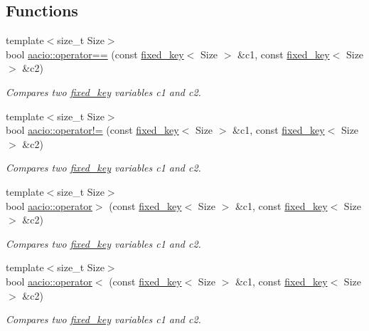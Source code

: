 \subsection*{Functions}
\begin{DoxyCompactItemize}
\item 
{\footnotesize template$<$size\+\_\+t Size$>$ }\\bool \mbox{\hyperlink{group__fixed__key_gaa365a67b127212444054c9efbaad8b4b}{aacio\+::operator==}} (const \mbox{\hyperlink{classaacio_1_1fixed__key}{fixed\+\_\+key}}$<$ Size $>$ \&c1, const \mbox{\hyperlink{classaacio_1_1fixed__key}{fixed\+\_\+key}}$<$ Size $>$ \&c2)
\begin{DoxyCompactList}\small\item\em Compares two \mbox{\hyperlink{classaacio_1_1fixed__key}{fixed\+\_\+key}} variables c1 and c2. \end{DoxyCompactList}\item 
{\footnotesize template$<$size\+\_\+t Size$>$ }\\bool \mbox{\hyperlink{group__fixed__key_ga89d7a8005af97542faaa281cec576db7}{aacio\+::operator!=}} (const \mbox{\hyperlink{classaacio_1_1fixed__key}{fixed\+\_\+key}}$<$ Size $>$ \&c1, const \mbox{\hyperlink{classaacio_1_1fixed__key}{fixed\+\_\+key}}$<$ Size $>$ \&c2)
\begin{DoxyCompactList}\small\item\em Compares two \mbox{\hyperlink{classaacio_1_1fixed__key}{fixed\+\_\+key}} variables c1 and c2. \end{DoxyCompactList}\item 
{\footnotesize template$<$size\+\_\+t Size$>$ }\\bool \mbox{\hyperlink{group__fixed__key_ga56d88aaf07a50b73e0494386c9f74fe9}{aacio\+::operator$>$}} (const \mbox{\hyperlink{classaacio_1_1fixed__key}{fixed\+\_\+key}}$<$ Size $>$ \&c1, const \mbox{\hyperlink{classaacio_1_1fixed__key}{fixed\+\_\+key}}$<$ Size $>$ \&c2)
\begin{DoxyCompactList}\small\item\em Compares two \mbox{\hyperlink{classaacio_1_1fixed__key}{fixed\+\_\+key}} variables c1 and c2. \end{DoxyCompactList}\item 
{\footnotesize template$<$size\+\_\+t Size$>$ }\\bool \mbox{\hyperlink{group__fixed__key_ga7cb9ba21f0abfeb8ba49be15a73dd0eb}{aacio\+::operator$<$}} (const \mbox{\hyperlink{classaacio_1_1fixed__key}{fixed\+\_\+key}}$<$ Size $>$ \&c1, const \mbox{\hyperlink{classaacio_1_1fixed__key}{fixed\+\_\+key}}$<$ Size $>$ \&c2)
\begin{DoxyCompactList}\small\item\em Compares two \mbox{\hyperlink{classaacio_1_1fixed__key}{fixed\+\_\+key}} variables c1 and c2. \end{DoxyCompactList}\end{DoxyCompactItemize}


